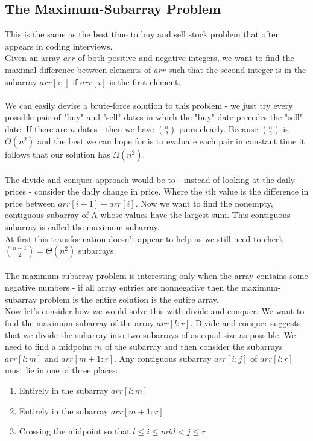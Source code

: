\documentclass{scrartcl}
\theoremstyle{definition}
\theoremstyle{definition}
\theoremstyle{remark}
\numberwithin{equation}{section}
\begin{document}
\subsection{The Maximum-Subarray Problem}
This is the same as the best time to buy and sell stock problem that often appears in coding interviews. \\
Given an array $arr$ of both positive and negative integers, we want to find the maximal difference between elements of $arr$ such that the second integer is in the subarray $arr[i:]$ if $arr[i]$ is the first element.\\
\\
We can easily devise a brute-force solution to this problem - we just try every possible pair of "buy" and "sell" dates in which the "buy" date precedes the "sell" date. If there are $n$ dates - then we have $\binom{n}{2}$ pairs clearly. Because $\binom{n}{2}$ is $\Theta(n^2)$ and the best we can hope for is to evaluate each pair in constant time it follows that our solution has $\Omega(n^2)$.\\
\\
The divide-and-conquer approach would be to - instead of looking at the daily prices - consider the daily change in price. Where the $i$th value is the difference in price between $arr[i+1]-arr[i]$. Now we want to find the nonempty, contiguous subarray of A whose values have the largest sum. This contiguous subarray is called the maximum subarray.\\
At first this transformation doesn't appear to help as we still need to check $\binom{n-1}{2}=\Theta(n^2)$ subarrays.\\
\\
The maximum-subarray problem is interesting only when the array contains some negative numbers - if all array entries are nonnegative then the maximum-subarray problem is the entire solution is the entire array.\\
Now let's consider how we would solve this with divide-and-conquer. We want to find the maximum subarray of the array $arr[l:r]$. Divide-and-conquer suggests that we divide the subarray into two subarrays of as equal size as possible. We need to find a midpoint $m$ of the subarray and then consider the subarrays $arr[l:m]$ and $arr[m+1:r]$. Any contiguous subarray $arr[i:j]$ of $arr[l:r]$ must lie in one of three places:
\begin{enumerate}
    \item Entirely in the subarray $arr[l:m]$
    \item Entirely in the subarray $arr[m+1:r]$
    \item Crossing the midpoint so that $l\leq i\leq mid < j\leq r$
\end{enumerate}
\end{document}
